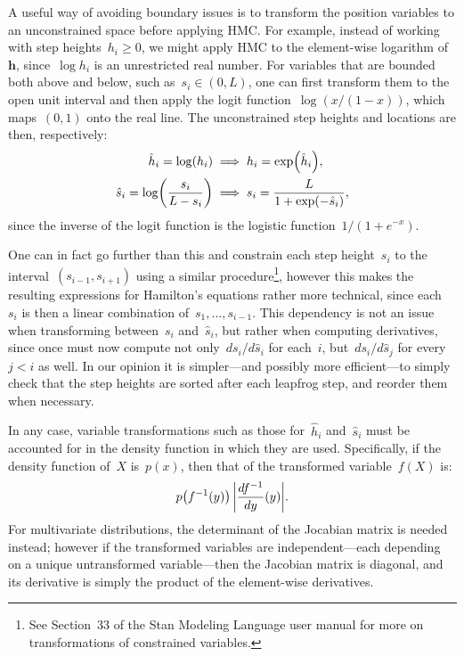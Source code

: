 \documentclass[11pt,a4paper]{article}
\newcommand\ub[1]{\symbf{#1}}                    %
\DeclarePairedDelimiter\lr{\lparen}{\rparen}     %
\DeclarePairedDelimiter\abs{\lvert}{\rvert}      %
\theoremstyle{definition}
\begin{document}
A useful way of avoiding boundary issues is to transform the position variables
to an unconstrained space before applying HMC. For example, instead of working
with step heights~$h_i \ge 0$, we might apply HMC to the element-wise logarithm
of~$\ub{h}$, since~$\log h_i$ is an unrestricted real number. For variables that
are bounded both above and below, such as~$s_i \in (0,L)$, one can first
transform them to the open unit interval and then apply the logit
function~$\log(x/(1-x))$, which maps~$(0,1)$ onto the real line. The
unconstrained step heights and locations are then, respectively:
\begin{equation}\label{eqn:transform}
\begin{aligned}
  \hat{h}_i = \log(h_i)
    &\implies h_i = \exp\lr*{\hat{h}_i}, \\
  \hat{s}_i = \log\lr*{\frac{s_i}{L-s_i}}
    &\implies s_i = \frac{L}{1+\exp\lr*{-\hat{s}_i}},
\end{aligned}
\end{equation}
since the inverse of the logit function is the logistic function~$1/(1+e^{-x})$.

One can in fact go further than this and constrain each step height~$s_i$ to the
interval~$(s_{i-1},s_{i+1})$ using a similar procedure\footnote{See Section~33
of the Stan Modeling Language user manual for more on transformations of
constrained variables.}, however this makes the resulting expressions for
Hamilton's equations rather more technical, since each~$s_i$ is then a linear
combination of~$s_1,\dots,s_{i-1}$. This dependency is not an issue when
transforming between~$s_i$ and~$\hat{s}_i$, but rather when computing
derivatives, since once must now compute not only~$ds_i/d\hat{s}_i$ for
each~$i$, but~$ds_i/d\hat{s}_j$ for every~$j < i$ as well. In our opinion it is
simpler---and possibly more efficient---to simply check that the step heights
are sorted after each leapfrog step, and reorder them when necessary.

In any case, variable transformations such as those for~$\hat{h}_i$
and~$\hat{s}_i$ must be accounted for in the density function in which they are
used. Specifically, if the density function of~$X$ is~$p(x)$, then that of the
transformed variable~$f(X)$ is:
\[ p\lr*{f^{-1}(y)}\, \abs*{\frac{df^{-1}}{dy}(y)}. \]
For multivariate distributions, the determinant of the Jocabian matrix is needed
instead; however if the transformed variables are independent---each depending
on a unique untransformed variable---then the Jacobian matrix is diagonal, and
its derivative is simply the product of the element-wise derivatives.
\end{document}
